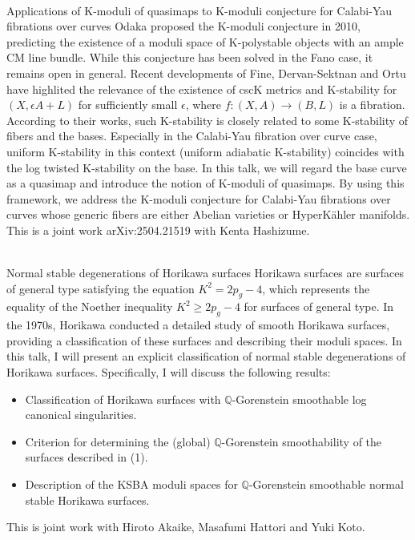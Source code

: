\documentclass[dvipdfmx,a4paper,12pt]{article}
\theoremstyle{plain} %
\theoremstyle{definition} %
\begin{document}
\\
Applications of K-moduli of quasimaps to K-moduli conjecture for Calabi-Yau fibrations over curves
\vskip3mm
Odaka proposed the K-moduli conjecture in 2010, predicting the existence of a moduli space of K-polystable objects with an ample CM line bundle. While this conjecture has been solved in the Fano case, it remains open in general. Recent developments of Fine, Dervan-Sektnan and Ortu have highlited the relevance of the existence of cscK metrics and K-stability for 
$(X,\epsilon A+L)$ for sufficiently small $\epsilon$, where $f\colon (X,A)\to (B,L)$ is a fibration. According to their works, such K-stability is closely related to some K-stability of fibers and the bases. Especially in the Calabi-Yau fibration over curve case, uniform K-stability in this context (uniform adiabatic K-stability) coincides with the log twisted K-stability on the base. In this talk, we will regard the base curve as a quasimap and introduce the notion of K-moduli of quasimaps. By using this framework, we address the K-moduli conjecture for Calabi-Yau fibrations over curves whose generic fibers are either Abelian varieties or HyperK\"ahler manifolds. This is a joint work arXiv:2504.21519 with Kenta Hashizume.
\vskip8mm

\newpage

\\
Normal stable degenerations of Horikawa surfaces
\vskip3mm
Horikawa surfaces are surfaces of general type satisfying the equation $K^2=2p_g-4$, which represents the equality of the Noether inequality $K^2\ge2p_g-4$ for surfaces of general type. In the 1970s, Horikawa conducted a detailed study of smooth Horikawa surfaces, providing a classification of these surfaces and describing their moduli spaces.
In this talk, I will present an explicit classification of normal stable degenerations of Horikawa surfaces. Specifically, I will discuss the following results:
\begin{itemize}
\item[(1)] Classification of Horikawa surfaces with $\mathbb{Q}$-Gorenstein smoothable log canonical singularities.
\item[(2)] Criterion for determining the (global) $\mathbb{Q}$-Gorenstein smoothability of the surfaces described in (1).
\item[(3)] Description of the KSBA moduli spaces for $\mathbb{Q}$-Gorenstein smoothable normal stable Horikawa surfaces.
\end{itemize}
This is joint work with Hiroto Akaike, Masafumi Hattori and Yuki Koto.
\vskip8mm
\end{document}

